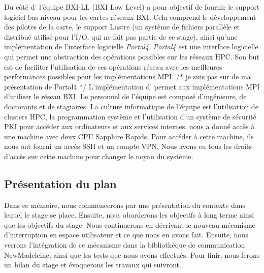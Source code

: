 Du côté d'\atos{} l'équipe BXI-LL (BXI Low Level) a pour objectif de fournir le support logiciel bas niveau pour les cartes réseaux BXI.
Cela comprend le développement des pilotes de la carte, le support Lustre (un système de fichiers parallèle et distribué utilisé pour l'I/O, qui ne fait pas partie de ce stage), ainsi qu'une implémentation de l'interface logicielle \emph{Portal4}.
\emph{Portal4} est une interface logicielle qui permet une abstraction des opérations possibles sur les réseaux HPC.
Son but est de faciliter l'utilisation de ces opérations réseau avec les meilleures performances possibles pour les implémentations MPI. /* je suis pas sur de ma présentation de Portal4 */
L'implémentation d'\atos{} permet aux implémentations MPI d'utiliser le réseau BXI.
Le personnel de l'équipe est composé d'ingénieurs, de doctorants et de stagiaires.
La culture informatique de l'équipe est l'utilisation de clusters HPC, la programmation système et l'utilisation d'un système de sécurité PKI pour accéder aux ordinateurs et aux services internes.
\atos{} nous a donné accès à une machine avec deux CPU \intel{} Sapphire Rapids.
Pour accéder à cette machine, ils nous ont fourni un accès SSH et un compte VPN.
Nous avons eu tous les droits d'accès sur cette machine pour changer le noyau du système.

\subsection{Présentation du plan}

Dans ce mémoire, nous commencerons par une présentation du contexte dans lequel le stage se place.
Ensuite, nous aborderons les objectifs à long terme ainsi que les objectifs du stage.
Nous continuerons en décrivant le nouveau mécanisme d'interruption en espace utilisateur et ce que nous en avons fait.
Ensuite, nous verrons l'intégration de ce mécanisme dans la bibliothèque de communication NewMadeleine, ainsi que les tests que nous avons effectués.
Pour finir, nous ferons un bilan du stage et évoquerons les travaux qui suivront.
